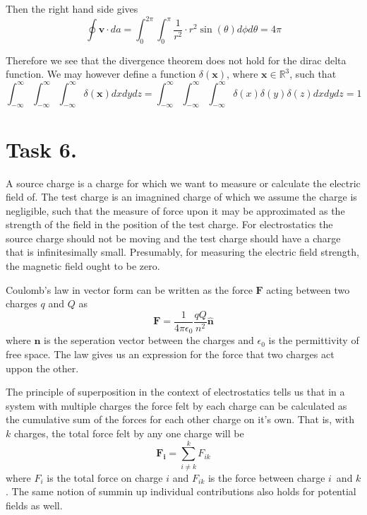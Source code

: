 \documentclass[a4paper,11pt]{article}
\begin{document}
Then the right hand side gives
\[
    \oint \mathbf{v} \cdot da = \int_{0}^{2\pi} \int_{0}^{\pi} \frac{1}{r^2} \cdot r^2 \sin(\theta) d\phi d\theta = 4\pi
\]

Therefore we see that the divergence theorem does not hold for the dirac delta function. We may however define a function 
$\delta(\mathbf{x})$, where $\mathbf{x} \in \mathbb{R}^3$, such that
\[
    \int_{-\infty}^{\infty}\int_{-\infty}^{\infty}\int_{-\infty}^{\infty} \delta(\mathbf{x}) dxdydz = \int_{-\infty}^{\infty}\int_{-\infty}^{\infty}\int_{-\infty}^{\infty} \delta(x)\delta(y)\delta(z) dxdydz = 1
\]

\section*{Task 6.}
\begin{romanlist}
    \item A source charge is a charge for which we want to measure or calculate the electric field of. The test charge is an imagnined charge 
        of which we assume the charge is negligible, such that the measure of force upon it may be approximated as the strength of the field in the 
        position of the test charge. For electrostatics the source charge should not be moving and the test charge should have a charge that is 
        infinitesimally small. Presumably, for measuring the electric field strength, the magnetic field ought to be zero.
    \item Coulomb's law in vector form can be written as the force $\mathbf{F}$ acting between two charges $q$ and $Q$ as
        \[
            \mathbf{F} = \frac{1}{4\pi \epsilon_0}\frac{qQ}{n^2}\mathbf{\hat{n}}
        \]
        where $\mathbf{n}$ is the seperation vector between the charges and $\epsilon_0$ is the permittivity of free space.
        The law gives us an expression for the force that two charges act uppon the other.
    \item The principle of superposition in the context of electrostatics tells us that in a system with multiple charges
        the force felt by each charge can be calculated as the cumulative sum of the forces for each other charge on it's own. That is,
        with $k$ charges, the total force felt by any one charge will be
        \[
            \mathbf{F_i} = \sum_{i \neq k}^{k} F_{ik}
        \]
        where $F_i$ is the total force on charge $i$ and $F_{ik}$ is the force between charge $i$ and $k$. The same 
        notion of summin up individual contributions also holds for potential fields as well.

\end{romanlist}
\end{document}
